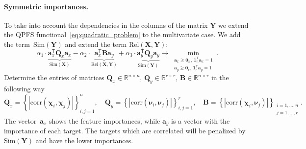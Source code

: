 \documentclass[12pt,twoside]{article}
\theoremstyle{definition}
\newcommand{\ba}{\mathbf{a}}
\newcommand{\bY}{\mathbf{Y}}
\newcommand{\bX}{\mathbf{X}}
\newcommand{\bB}{\mathbf{B}}
\newcommand{\bQ}{\mathbf{Q}}
\newcommand{\bbR}{\mathbb{R}}
\newcommand{\T}{\mathsf{T}}
\newcommand{\bchi}{\boldsymbol{\chi}}
\newcommand{\bnu}{\boldsymbol{\nu}}
\newcommand{\bOne}{\boldsymbol{1}}
\newcommand{\bZero}{\boldsymbol{0}}
\begin{document}
\paragraph{Symmetric importances.}

To take into account the dependencies in the columns of the matrix $\bY$ we extend the QPFS functional~\eqref{eq:quadratic_problem} to the multivariate case.
We add the term~$\text{Sim}(\bY)$ and extend the term $\text{Rel}(\bX, \bY)$:
\begin{equation}
	\alpha_1 \cdot \underbrace{\ba_x^{\T} \bQ_x \ba_x}_{\text{Sim}(\bX)} - \alpha_2 \cdot \underbrace{\ba_x^{\T} \bB \ba_y}_{\text{Rel}(\bX, \bY)} + \alpha_3 \cdot \underbrace{\ba_y^{\T} \bQ_y \ba_y}_{\text{Sim}(\bY)} \rightarrow \min_{\substack{\ba_x \geq \bZero_n, \, \bOne_n^{\T}\ba_x=1 \\ \ba_y \geq \bZero_r, \, \bOne_r^{\T}\ba_y=1}}.
	\label{eq:multivariate_quadratic_problem}
\end{equation}
Determine the entries of matrices $\bQ_x \in \bbR^{n \times n}$, $\bQ_y \in \bbR^{r \times r}$, $\bB \in \bbR^{n \times r}$ in the following way
\begin{equation*}
	\bQ_x = \left\{ \left| \text{corr}(\bchi_i, \bchi_j) \right| \right\}_{i,j=1}^n, \quad
	\bQ_y = \left\{ \left| \text{corr}(\bnu_i, \bnu_j) \right| \right\}_{i,j=1}^r, \quad
	\bB =  \left\{ \left| \text{corr}(\bchi_i, \bnu_j) \right| \right\}_{\substack{i=1, \dots, n \\ j=1, \dots, r}}.
\end{equation*}
The vector~$\ba_x$ shows the feature importances, while $\ba_y$ is a vector with the importance of each target.
The targets which are correlated will be penalized by $\text{Sim} (\bY)$ and have the lower importances.
\end{document}
